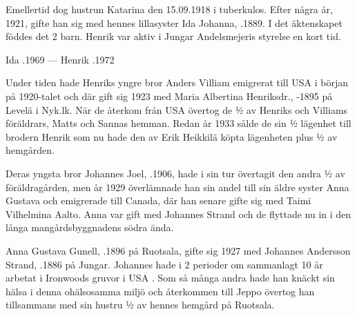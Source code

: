 Emellertid dog hustrun Katarina den 15.09.1918 i tuberkulos. Efter några år, 1921, gifte han sig med hennes lillasyster Ida Johanna, .1889. I det äktenskapet föddes det 2 barn. Henrik var aktiv i Jungar Andelsmejeris styrelse en kort tid.
\begin{jhchildren}
  \item {}
  \item {}
  \item {}
  \item {}
  \item {}
  \item {}
  \item {}
\end{jhchildren}

Ida .1969  ---  Henrik .1972

Under tiden hade Henriks yngre bror Anders Villiam emigrerat till USA i början på 1920-talet och där gift sig 1923 med Maria Albertina Henriksdr., -1895 på Levelä i Nyk.lk. När de återkom från USA övertog de ½ av Henriks och Villiams föräldrars,  Matts och Sannas hemman. Redan år 1933 sålde de sin ½ lägenhet till brodern Henrik som nu hade den av Erik Heikkilä köpta lägenheten plus ½ av hemgården.

Deras yngsta bror Johannes Joel, .1906, hade i sin tur övertagit den andra ½  av föräldragården, men år 1929  överlämnade han sin andel till sin äldre syster Anna Gustava och emigrerade till Canada, där han senare gifte sig med Taimi Vilhelmina Aalto. Anna var gift med Johannes Strand och de flyttade nu in i den långa mangårdsbyggnadens södra ända.


Anna Gustava Gunell, .1896 på Ruotsala, gifte sig 1927 med Johannes Andersson Strand, .1886 på Jungar. Johannes hade i 2 perioder om sammanlagt 10 år arbetat i Ironwoods gruvor i USA . Som så många andra hade han knäckt sin hälsa i denna ohälsosamma miljö och återkommen till Jeppo övertog han tillsammans med sin hustru ½ av hennes hemgård på Ruotsala.

